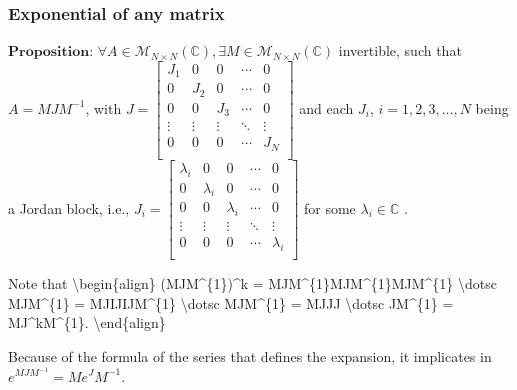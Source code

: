 \documentclass[letterpaper,10pt,english]{jupyterBook}
\begin{document}
\subsubsection{Exponential of any matrix}
\label{\detokenize{cap3:exponential-of-any-matrix}}
\sphinxAtStartPar
\(\textbf{Proposition: } \forall A \in \mathscr{M}_{N \times N}(\mathbb{C}), \exists M \in \mathscr{M}_{N \times N}(\mathbb{C})\) invertible, such that \(A = MJM^{-1}\), with \( J = \left[ {\begin{array}{ccccc}
    J_1 & 0 & 0 & \dotsm & 0\\
    0 & J_2 & 0 & \dotsm & 0\\
    0 & 0 & J_3 & \dotsm & 0\\
    \vdots & \vdots & \vdots & \ddots & \vdots\\
    0 & 0 & 0 & \dotsm & J_{N}\\
\end{array} } \right] \) and each \(J_i\), \(i = 1, 2, 3, \dotsc, N\) being a Jordan block, i.e., \(J_i = \left[ {\begin{array}{ccccc}
    \lambda_i & 0 & 0 & \dotsm & 0\\
    0 & \lambda_i & 0 & \dotsm & 0\\
    0 & 0 & \lambda_i & \dotsm & 0\\
    \vdots & \vdots & \vdots & \ddots & \vdots\\
    0 & 0 & 0 & \dotsm & \lambda_i\\
\end{array} } \right]\) for some \(\lambda_i \in \mathbb{C}\) .

\sphinxAtStartPar
Note that
\textbackslash{}begin\{align\}
(MJM\textasciicircum{}\{\sphinxhyphen{}1\})\textasciicircum{}k = MJM\textasciicircum{}\{\sphinxhyphen{}1\}MJM\textasciicircum{}\{\sphinxhyphen{}1\}MJM\textasciicircum{}\{\sphinxhyphen{}1\} \textbackslash{}dotsc MJM\textasciicircum{}\{\sphinxhyphen{}1\} = MJIJIJM\textasciicircum{}\{\sphinxhyphen{}1\} \textbackslash{}dotsc MJM\textasciicircum{}\{\sphinxhyphen{}1\} = MJJJ \textbackslash{}dotsc JM\textasciicircum{}\{\sphinxhyphen{}1\} = MJ\textasciicircum{}kM\textasciicircum{}\{\sphinxhyphen{}1\}.
\textbackslash{}end\{align\}

\sphinxAtStartPar
Because of the formula of the series that defines the expansion, it implicates in \(e^{MJM^{-1}} = M e^J M^{-1}\).
\end{document}
